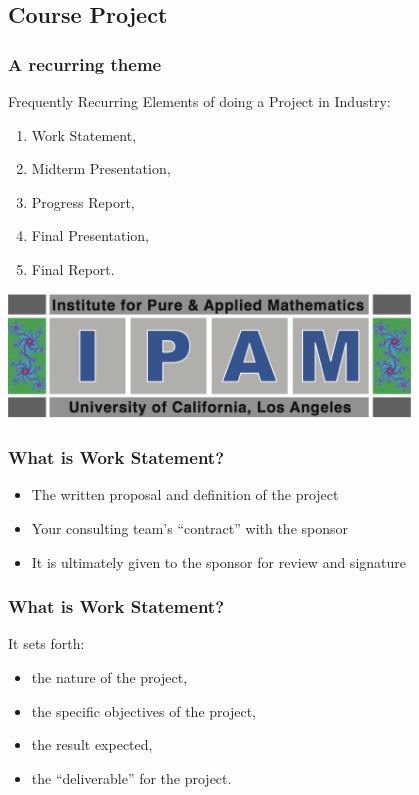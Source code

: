 \documentclass[hyperref={colorlinks=false},compress,handout,10pt]{beamer}
\let\olditem\item
\renewcommand{\item}{\setlength{\itemsep}{0.5\baselineskip}\olditem}
\begin{document}
\subsection{Course Project}
\begin{frame}
    \frametitle{A recurring theme}
    Frequently Recurring Elements of doing a Project in Industry:
    \vspace{7pt}
             \begin{enumerate}
                 \item Work Statement,
                 \item Midterm Presentation,
                 \item Progress Report,
                 \item Final Presentation,
                 \item Final Report.
             \end{enumerate}
    \begin{center}
        \href{http://www.ipam.ucla.edu/programs/rips2011/}{
        \includegraphics[width=0.8\textwidth]{images/ipam}}        
    \end{center}
\end{frame}

\begin{frame}
    \frametitle{What is Work Statement?}
    \begin{itemize}
        \item The written proposal and definition of the project
            \vspace{1cm}
        \item Your consulting team's ``contract'' with the sponsor
            \vspace{1cm}
        \item It is ultimately given to the sponsor for review and signature
    \end{itemize}
\end{frame}



\begin{frame}
    \frametitle{What is Work Statement?}
It sets forth: 
    \begin{itemize}
        \item the nature of the project,
        \item the specific objectives of the project, 
        \item the result expected, 
        \item the ``deliverable'' for the project.
    \end{itemize}
\end{frame}
\end{document}
